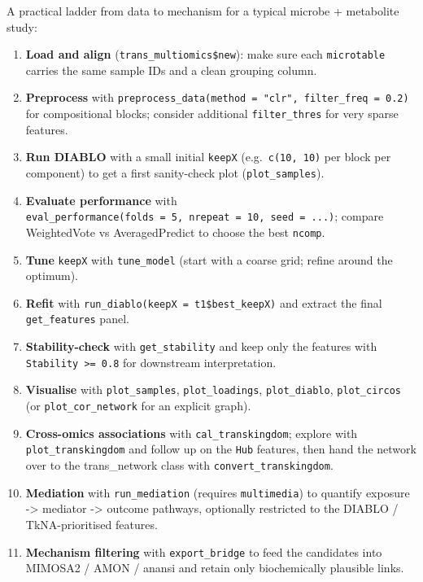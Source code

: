 \documentclass[
]{book}
\providecommand{\tightlist}{%
  \setlength{\itemsep}{0pt}\setlength{\parskip}{0pt}}
\begin{document}
A practical ladder from data to mechanism for a typical microbe + metabolite study:

\begin{enumerate}
\def\labelenumi{\arabic{enumi}.}
\tightlist
\item
  \textbf{Load and align} (\texttt{trans\_multiomics\$new}): make sure each \texttt{microtable} carries the same sample IDs and a clean grouping column.
\item
  \textbf{Preprocess} with \texttt{preprocess\_data(method\ =\ "clr",\ filter\_freq\ =\ 0.2)} for compositional blocks; consider additional \texttt{filter\_thres} for very sparse features.
\item
  \textbf{Run DIABLO} with a small initial \texttt{keepX} (e.g.~\texttt{c(10,\ 10)} per block per component) to get a first sanity-check plot (\texttt{plot\_samples}).
\item
  \textbf{Evaluate performance} with \texttt{eval\_performance(folds\ =\ 5,\ nrepeat\ =\ 10,\ seed\ =\ ...)}; compare WeightedVote vs AveragedPredict to choose the best \texttt{ncomp}.
\item
  \textbf{Tune} \texttt{keepX} with \texttt{tune\_model} (start with a coarse grid; refine around the optimum).
\item
  \textbf{Refit} with \texttt{run\_diablo(keepX\ =\ t1\$best\_keepX)} and extract the final \texttt{get\_features} panel.
\item
  \textbf{Stability-check} with \texttt{get\_stability} and keep only the features with \texttt{Stability\ \textgreater{}=\ 0.8} for downstream interpretation.
\item
  \textbf{Visualise} with \texttt{plot\_samples}, \texttt{plot\_loadings}, \texttt{plot\_diablo}, \texttt{plot\_circos} (or \texttt{plot\_cor\_network} for an explicit graph).
\item
  \textbf{Cross-omics associations} with \texttt{cal\_transkingdom}; explore with \texttt{plot\_transkingdom} and follow up on the \texttt{Hub} features, then hand the network over to the trans\_network class with \texttt{convert\_transkingdom}.
\item
  \textbf{Mediation} with \texttt{run\_mediation} (requires \texttt{multimedia}) to quantify exposure -\textgreater{} mediator -\textgreater{} outcome pathways, optionally restricted to the DIABLO / TkNA-prioritised features.
\item
  \textbf{Mechanism filtering} with \texttt{export\_bridge} to feed the candidates into MIMOSA2 / AMON / anansi and retain only biochemically plausible links.
\end{enumerate}
\end{document}
